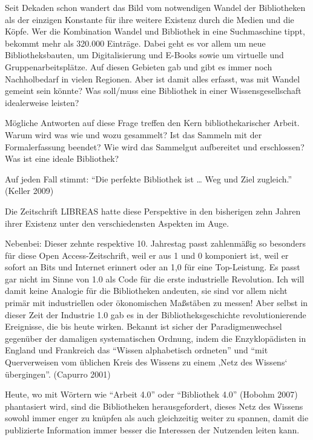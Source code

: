 Seit Dekaden schon wandert das Bild vom notwendigen Wandel der
Bibliotheken als der einzigen Konstante für ihre weitere Existenz durch
die Medien und die Köpfe. Wer die Kombination Wandel und Bibliothek in
eine Suchmaschine tippt, bekommt mehr als 320.000 Einträge. Dabei geht
es vor allem um neue Bibliotheksbauten, um Digitalisierung und E-Books
sowie um virtuelle und Gruppenarbeitsplätze. Auf diesen Gebieten gab und
gibt es immer noch Nachholbedarf in vielen Regionen. Aber ist damit
alles erfasst, was mit Wandel gemeint sein könnte? Was soll/muss eine
Bibliothek in einer Wissensgesellschaft idealerweise leisten?

Mögliche Antworten auf diese Frage treffen den Kern bibliothekarischer
Arbeit. Warum wird was wie und wozu gesammelt? Ist das Sammeln mit der
Formalerfassung beendet? Wie wird das Sammelgut aufbereitet und
erschlossen? Was ist eine ideale Bibliothek?

Auf jeden Fall stimmt: \enquote{Die perfekte Bibliothek ist \ldots{} Weg
und Ziel zugleich.} (Keller 2009)

Die Zeitschrift LIBREAS hatte diese Perspektive in den bisherigen zehn
Jahren ihrer Existenz unter den verschiedensten Aspekten im Auge.

Nebenbei: Dieser zehnte respektive 10. Jahrestag passt zahlenmäßig so
besonders für diese Open Access-Zeitschrift, weil er aus 1 und 0
komponiert ist, weil er sofort an Bits und Internet erinnert oder an 1,0
für eine Top-Leistung. Es passt gar nicht im Sinne von 1.0 als Code für
die erste industrielle Revolution. Ich will damit keine Analogie für die
Bibliotheken andeuten, sie sind vor allem nicht primär mit industriellen
oder ökonomischen Maßstäben zu messen! Aber selbst in dieser Zeit der
Industrie 1.0 gab es in der Bibliotheksgeschichte revolutionierende
Ereignisse, die bis heute wirken. Bekannt ist sicher der
Paradigmenwechsel gegenüber der damaligen systematischen Ordnung, indem
die Enzyklopädisten in England und Frankreich das \enquote{Wissen
alphabetisch ordneten} und \enquote{mit Querverweisen vom üblichen Kreis
des Wissens zu einem ‚Netz des Wissens` übergingen}. (Capurro 2001)

Heute, wo mit Wörtern wie \enquote{Arbeit 4.0} oder \enquote{Bibliothek
4.0} (Hobohm 2007) phantasiert wird, sind die Bibliotheken
herausgefordert, dieses Netz des Wissens sowohl immer enger zu knüpfen
als auch gleichzeitig weiter zu spannen, damit die publizierte
Information immer besser die Interessen der Nutzenden leiten kann.

